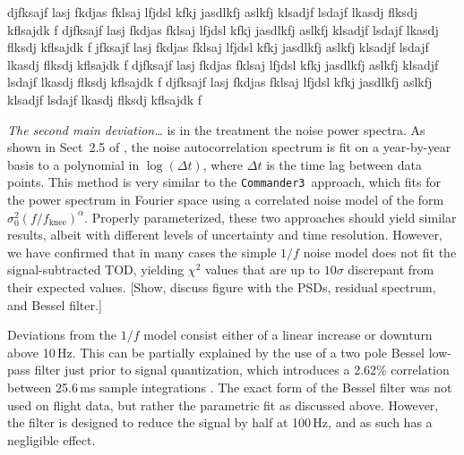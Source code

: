 \documentclass[twocolumn]{../../common/aa}
\def\commanderthree{\texttt{Commander3}}
\begin{document}
djfksajf lasj fkdjas fklsaj lfjdsl kfkj jasdlkfj aslkfj klsadjf lsdajf lkasdj flksdj kflsajdk f
djfksajf lasj fkdjas fklsaj lfjdsl kfkj jasdlkfj aslkfj klsadjf lsdajf lkasdj flksdj kflsajdk f
jfksajf lasj fkdjas fklsaj lfjdsl kfkj jasdlkfj aslkfj klsadjf lsdajf lkasdj flksdj kflsajdk f
djfksajf lasj fkdjas fklsaj lfjdsl kfkj jasdlkfj aslkfj klsadjf lsdajf lkasdj flksdj kflsajdk f
djfksajf lasj fkdjas fklsaj lfjdsl kfkj jasdlkfj aslkfj klsadjf lsdajf lkasdj flksdj kflsajdk f






\textit{The second main deviation\ldots} is in the treatment the noise power spectra. As shown
in Sect~2.5 of \citet{jarosik2007}, the noise autocorrelation spectrum is fit
on a year-by-year basis to a polynomial in $\log(\Delta t)$, where $\Delta t$
is the time lag between data points. This method is very similar to the
\commanderthree\ approach, which fits for the power spectrum in Fourier space
using a correlated noise model of the form
$\sigma_0^2(f/f_\mathrm{knee})^{\alpha}$. Properly parameterized, these two
approaches should yield similar results, albeit with different levels of
uncertainty and time resolution. However, we have confirmed that in many cases
the simple $1/f$ noise model does not fit the signal-subtracted TOD, yielding
$\chi^2$ values that are up to $10\sigma$ discrepant from their expected
values.  [Show, discuss figure with the PSDs, residual spectrum, and Bessel
filter.]

Deviations from the $1/f$ model consist either of a linear increase or downturn
above 10\,Hz. This can be partially explained by the use of a two pole Bessel
low-pass filter just prior to signal quantization, which introduces a 2.62\%
correlation between 25.6\,ms sample integrations
\citep[][Sect.~5.3]{jarosik2003:MAP}. The exact form of the Bessel filter was
not used on flight data, but rather the parametric fit as discussed above.
However, the filter is designed to reduce the signal by half at 100\,Hz, and as
such has a negligible effect. 
\end{document}
